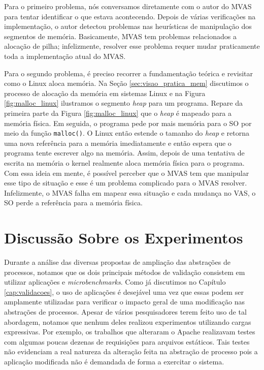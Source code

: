 Para o primeiro problema, nós conversamos diretamente com o autor do MVAS para
tentar identificar o que estava acontecendo. Depois de várias verificações na implementação,
o autor detectou problemas nas heurísticas de manipulação dos segmentos de
memória.  Basicamente, MVAS tem problemas relacionados a alocação de
pilha; infelizmente, resolver esse problema requer mudar praticamente
toda a implementação atual do MVAS.

Para o segundo problema, é preciso recorrer a fundamentação teórica e revisitar
como o Linux aloca memória. Na Seção \ref{sec:visao_pratica_mem} discutimos o
processo de alocação da memória em sistemas Linux e na Figura
\ref{fig:malloc_linux} ilustramos o segmento \emph{heap} para um programa.
Repare da primeira parte da Figura \ref{fig:malloc_linux} que o \emph{heap} é
mapeado para a memória física. Em seguida, o programa pede por mais memória
para o SO por meio da função \texttt{malloc()}. O Linux então estende o tamanho
do \emph{heap} e retorna uma nova referência para a memória imediatamente e
então espera que o programa tente escrever algo na memória.  Assim, depois de
uma tentativa de escrita na memória o kernel realmente aloca memória física
para o programa. Com essa ideia em mente, é possível perceber que o MVAS tem
que manipular esse tipo de situação e esse é um problema complicado para o MVAS
resolver. Infelizmente, o MVAS falha em mapear essa situação e cada mudança no
VAS, o SO perde a referência para a memória física.

\section{Discussão Sobre os Experimentos}

Durante a análise das diversas propostas de ampliação das abstrações de
processos, notamos que os dois principais métodos de validação consistem em
utilizar aplicações e \textit{microbenchmarks}. Como já discutimos no Capítulo
\ref{cap:validacoes}, o uso de aplicações é desejável uma vez que essas podem
ser amplamente utilizadas para verificar o impacto geral de uma modificação nas
abstrações de processos. Apesar de vários pesquisadores terem feito uso de tal
abordagem, notamos que nenhum deles realizou experimentos utilizando cargas
expressivas. Por exemplo, os trabalhos que alteraram o Apache realizavam testes
com algumas poucas dezenas de requisições para arquivos estáticos. Tais testes
não evidenciam a real natureza da alteração feita na abstração de processo pois
a aplicação modificada não é demandada de forma a exercitar o sistema.


